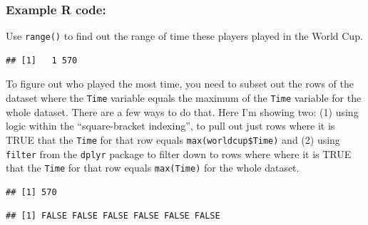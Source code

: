 \documentclass[]{book}
\makeatletter
\newenvironment{Shaded}{\begin{snugshade}}{\end{snugshade}}
\newcommand{\KeywordTok}[1]{\textcolor[rgb]{0.13,0.29,0.53}{\textbf{#1}}}
\newcommand{\StringTok}[1]{\textcolor[rgb]{0.31,0.60,0.02}{#1}}
\newcommand{\OperatorTok}[1]{\textcolor[rgb]{0.81,0.36,0.00}{\textbf{#1}}}
\newcommand{\NormalTok}[1]{#1}
\newenvironment{kframe}{%
\medskip{}
\setlength{\fboxsep}{.8em}
 \def\at@end@of@kframe{}%
 \ifinner\ifhmode%
  \def\at@end@of@kframe{\end{minipage}}%
  \begin{minipage}{\columnwidth}%
 \fi\fi%
 \def\FrameCommand##1{\hskip\@totalleftmargin \hskip-\fboxsep
 \colorbox{shadecolor}{##1}\hskip-\fboxsep
     \hskip-\linewidth \hskip-\@totalleftmargin \hskip\columnwidth}%
 \MakeFramed {\advance\hsize-\width
   \@totalleftmargin\z@ \linewidth\hsize
   \@setminipage}}%
 {\par\unskip\endMakeFramed%
 \at@end@of@kframe}
\renewenvironment{Shaded}{\begin{kframe}}{\end{kframe}}
\theoremstyle{definition}
\theoremstyle{definition}
\theoremstyle{definition}
\theoremstyle{remark}
\makeatother
\begin{document}
\subsubsection{Example R code:}\label{example-r-code-2}

Use \texttt{range()} to find out the range of time these players played
in the World Cup.

\begin{Shaded}
\end{Shaded}

\begin{verbatim}
## [1]   1 570
\end{verbatim}

To figure out who played the most time, you need to subset out the rows
of the dataset where the \texttt{Time} variable equals the maximum of
the \texttt{Time} variable for the whole dataset. There are a few ways
to do that. Here I'm showing two: (1) using logic within the
``square-bracket indexing'', to pull out just rows where it is TRUE that
the \texttt{Time} for that row equals \texttt{max(worldcup\$Time)} and
(2) using \texttt{filter} from the \texttt{dplyr} package to filter down
to rows where where it is TRUE that the \texttt{Time} for that row
equals \texttt{max(Time)} for the whole dataset.

\begin{Shaded}
\end{Shaded}

\begin{verbatim}
## [1] 570
\end{verbatim}

\begin{Shaded}
\end{Shaded}

\begin{verbatim}
## [1] FALSE FALSE FALSE FALSE FALSE FALSE
\end{verbatim}
\end{document}
